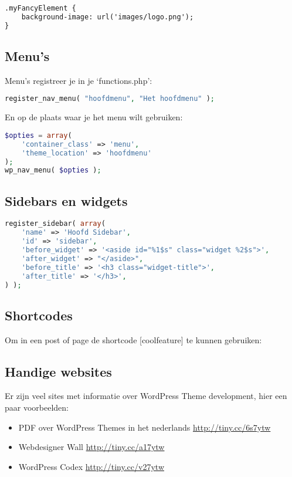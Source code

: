 \documentclass[8pt,pagesize,footinclude=false,headinclude=false]{scrartcl}
\begin{document}
\begin{multicols*}{2}
\begin{lstlisting}[language=HTML]
.myFancyElement {
	background-image: url('images/logo.png');
}
\end{lstlisting}

\subsection*{Menu's}
Menu's registreer je in je `functions.php':
\begin{lstlisting}[language=PHP]
register_nav_menu( "hoofdmenu", "Het hoofdmenu" );
\end{lstlisting}

En op de plaats waar je het menu wilt gebruiken:
\begin{lstlisting}[language=PHP]
$opties = array( 
	'container_class' => 'menu', 
	'theme_location' => 'hoofdmenu' 
);
wp_nav_menu( $opties ); 
\end{lstlisting}

\subsection*{Sidebars en widgets}

\begin{lstlisting}[language=PHP]
register_sidebar( array(
	'name' => 'Hoofd Sidebar',
	'id' => 'sidebar',
	'before_widget' => '<aside id="%1$s" class="widget %2$s">',
	'after_widget' => "</aside>",
	'before_title' => '<h3 class="widget-title">',
	'after_title' => '</h3>',
) );
\end{lstlisting}

\subsection*{Shortcodes}
Om in een post of page de shortcode [coolfeature] te kunnen gebruiken:




\subsection*{Handige websites}
Er zijn veel sites met informatie over WordPress Theme development, hier een paar voorbeelden:
\begin{itemize}
	\item PDF over WordPress Themes in het nederlands \url{http://tiny.cc/6s7ytw}
	\item Webdesigner Wall \url{http://tiny.cc/a17ytw}
	\item WordPress Codex \url{http://tiny.cc/v27ytw}
\end{itemize}

\end{multicols*}
\end{document}
